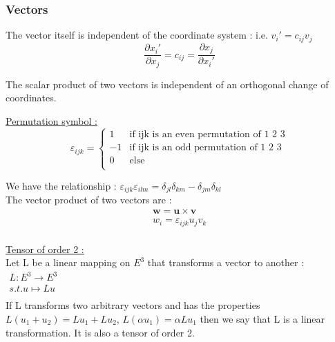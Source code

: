 \documentclass[../main.tex]{subfiles}
\begin{document}
\subsubsection{Vectors}
The vector itself is independent of the coordinate system : i.e. $v_i' = c_{ij}v_j$\\

\begin{equation}
    \frac{\partial x_i'}{\partial x_j} = c_{ij} = \frac{\partial x_j}{\partial x_i'}
\end{equation}

The scalar product of two vectors is independent of an orthogonal change of coordinates.

\quad \underline{Permutation symbol :}\\

\begin{equation}
    \varepsilon_{ijk} = \begin{cases}
        1 & \text{if ijk is an even permutation of 1 2 3}\\
        -1 & \text{if ijk is an odd permutation of 1 2 3}\\
        0 & \text{else}\\
    \end{cases}
\end{equation}

We have the relationship : $\varepsilon_{ijk}\varepsilon_{ilm} = \delta_{jl}\delta_{km} - \delta_{jm}\delta_{kl}$\\

The vector product of two vectors are : \begin{equation}\begin{gathered}
    \mathbf{w} = \mathbf{u} \times \mathbf{v} \\
    w_i = \varepsilon_{ijk}u_jv_k\\
    \end{gathered}
\end{equation}

\quad \underline{Tensor of order 2 :}\\

Let L be a linear mapping on $E^3$ that transforms a vector to another : $\begin{matrix}
    L : E^3 \rightarrow E^3\\
    s.t. u\mapsto Lu\\
\end{matrix}$\\
If L transforms two arbitrary vectors and has the properties $L(u_1+u_2) = Lu_1 + Lu_2$, $L(\alpha u_1) = \alpha Lu_1$ then we say that L is a linear transformation. It is also a tensor of order 2. \\
\end{document}
